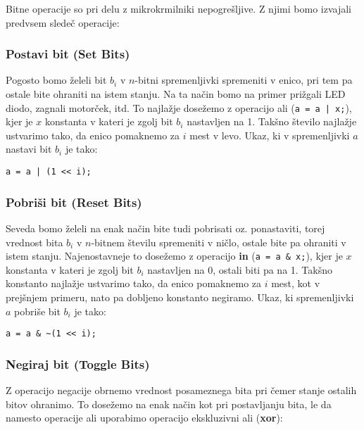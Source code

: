 \documentclass[12pt,letterpaper]{article}
\begin{document}
Bitne operacije so pri delu z mikrokrmilniki nepogrešljive. Z njimi bomo izvajali predvsem sledeč operacije:

\subsubsection*{Postavi bit (Set Bits)}
Pogosto bomo želeli bit $b_i$ v $n$-bitni spremenljivki spremeniti v enico, pri tem pa ostale bite ohraniti na istem stanju. Na ta način bomo na primer prižgali LED diodo, zagnali motorček, itd. To najlažje dosežemo z operacijo ali (\texttt{a = a | x;}), kjer je $x$ konstanta v kateri je zgolj bit $b_i$ nastavljen na 1. Takšno število najlažje ustvarimo tako, da enico pomaknemo za $i$ mest v levo. Ukaz, ki v spremenljivki $a$ nastavi bit $b_i$ je tako:

\begin{center}
\begin{lstlisting}[style=CStyle]
    a = a | (1 << i);
\end{lstlisting}
\end{center}

\subsubsection*{Pobriši bit (Reset Bits)}

Seveda bomo želeli na enak način bite tudi pobrisati oz. ponastaviti, torej vrednost bita $b_i$ v $n$-bitnem številu spremeniti v ničlo, ostale bite pa ohraniti v istem stanju. Najenostavneje to dosežemo z operacijo \textbf{in} (\texttt{a = a \& x;}), kjer je $x$ konstanta v kateri je zgolj bit $b_i$ nastavljen na 0, ostali biti pa na 1. Takšno konstanto najlažje ustvarimo tako, da enico pomaknemo za $i$ mest, kot v prejšnjem primeru, nato pa dobljeno konstanto negiramo. Ukaz, ki spremenljivki $a$ pobriše bit $b_i$ je tako:

\begin{center}
\begin{lstlisting}[style=CStyle]
    a = a & ~(1 << i);
\end{lstlisting}
\end{center}

\subsubsection*{Negiraj bit (Toggle Bits)}

Z operacijo negacije obrnemo vrednost posameznega bita pri čemer stanje ostalih bitov ohranimo. To dosežemo na enak način kot pri postavljanju bita, le da namesto operacije ali uporabimo operacijo ekskluzivni ali (\textbf{xor}):
\end{document}
